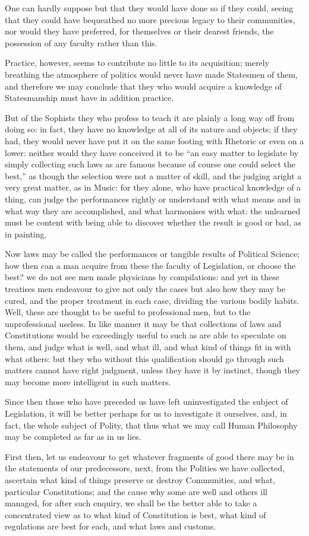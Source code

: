 One can hardly suppose but that they would have done so if they could, seeing
that they could have bequeathed no more precious legacy to their communities,
nor would they have preferred, for themselves or their dearest friends, the
possession of any faculty rather than this.

Practice, however, seems to contribute no little to its acquisition; merely
breathing the atmosphere of politics would never have made Statesmen of them,
and therefore we may conclude that they who would acquire a knowledge of
Statesmanship must have in addition practice.

But of the Sophists they who profess to teach it are plainly a long way off
from doing so: in fact, they have no knowledge at all of its nature and
objects; if they had, they would never have put it on the same footing with
Rhetoric or even on a lower: neither would they have conceived it to be
“an easy matter to legislate by simply collecting such laws as are famous
because of course one could select the best,” as though the selection
were not a matter of skill, and the judging aright a very great matter, as in
Music: for they alone, who have practical knowledge of a thing, can judge the
performances rightly or understand with what means and in what way they are
accomplished, and what harmonises with what: the unlearned must be content with
being able to discover whether the result is good or bad, as in painting.

Now laws may be called the performances or tangible results of Political
Science; how then can a man acquire from these the faculty of Legislation, or
choose the best? we do not see men made physicians by compilations: and yet in
these treatises men endeavour to give not only the cases but also how they may
be cured, and the proper treatment in each case, dividing the various bodily
habits. Well, these are thought to be useful to professional men, but to the
unprofessional useless. In like manner it may be that collections of laws and
Constitutions would be exceedingly useful to such as are able to speculate on
them, and judge what is well, and what ill, and what kind of things fit in with
what others: but they who without this qualification should go through such
matters cannot have right judgment, unless they have it by instinct, though
they may become more intelligent in such matters.

Since then those who have preceded us have left uninvestigated the subject of
Legislation, it will be better perhaps for us to investigate it ourselves, and,
in fact, the whole subject of Polity, that thus what we may call Human
Philosophy may be completed as far as in us lies.

First then, let us endeavour to get whatever fragments of good there may be in
the statements of our predecessors, next, from the Polities we have collected,
ascertain what kind of things preserve or destroy Communities, and what,
particular Constitutions; and the cause why some are well and others ill
managed, for after such enquiry, we shall be the better able to take a
concentrated view as to what kind of Constitution is best, what kind of
regulations are best for each, and what laws and customs.
